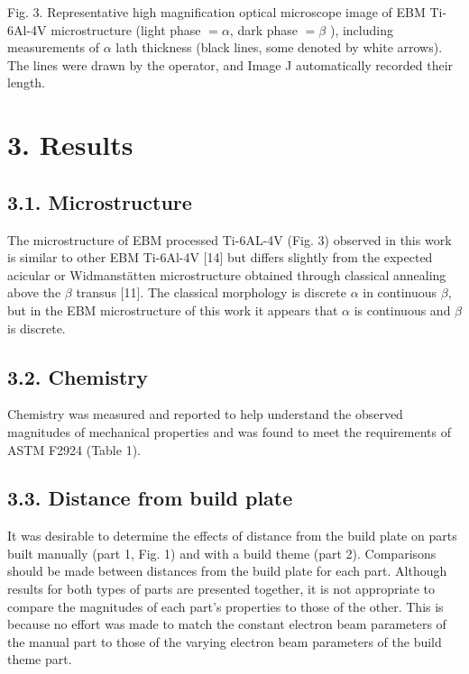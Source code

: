 \documentclass[10pt]{article}
\begin{document}
Fig. 3. Representative high magnification optical microscope image of EBM Ti-6Al-4V microstructure (light phase $=\alpha$, dark phase $=\beta$ ), including measurements of $\alpha$ lath thickness (black lines, some denoted by white arrows). The lines were drawn by the operator, and Image J automatically recorded their length.

\section*{3. Results}
\subsection*{3.1. Microstructure}
The microstructure of EBM processed Ti-6AL-4V (Fig. 3) observed in this work is similar to other EBM Ti-6Al-4V [14] but differs slightly from the expected acicular or Widmanstätten microstructure obtained through classical annealing above the $\beta$ transus [11]. The classical morphology is discrete $\alpha$ in continuous $\beta$, but in the EBM microstructure of this work it appears that $\alpha$ is continuous and $\beta$ is discrete.

\subsection*{3.2. Chemistry}
Chemistry was measured and reported to help understand the observed magnitudes of mechanical properties and was found to meet the requirements of ASTM F2924 (Table 1).

\subsection*{3.3. Distance from build plate}
It was desirable to determine the effects of distance from the build plate on parts built manually (part 1, Fig. 1) and with a build theme (part 2). Comparisons should be made between distances from the build plate for each part. Although results for both types of parts are presented together, it is not appropriate to compare the magnitudes of each part's properties to those of the other. This is because no effort was made to match the constant electron beam parameters of the manual part to those of the varying electron beam parameters of the build theme part.
\end{document}
